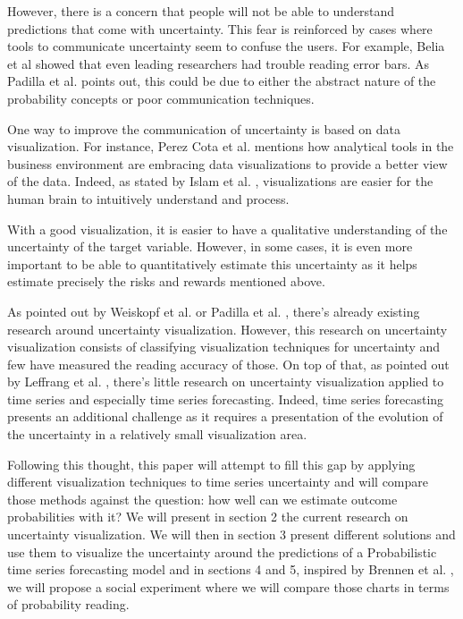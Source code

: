 \documentclass[a4paper,3p,sort&compress]{elsarticle}
\begin{document}
However, there is a concern that people will not be able to understand predictions that come with uncertainty.
This fear is reinforced by cases where tools to communicate uncertainty seem to confuse the users. For example,
Belia et al \cite{belia_researchers_2005} showed that even leading researchers had 
trouble reading error bars. 
As Padilla et al. \cite{padilla_uncertainty_2021} 
points out, this could be due to either the abstract nature of the probability concepts or poor communication techniques.

One way to improve the communication of uncertainty is based on data visualization. For instance, Perez Cota et al. 
\cite{cota_importance_2014} mentions how analytical tools in the business 
environment are embracing data visualizations to provide a better view of the data. Indeed, as 
stated by Islam et al. \cite{islam_overview_2019}, visualizations are easier for the human brain to intuitively understand and process.

With a good visualization, it is easier to have a qualitative understanding of the uncertainty of the target variable. 
However, in some cases, it is even more important to be able to quantitatively estimate this uncertainty as it helps estimate precisely 
the risks and rewards mentioned above. 

As pointed out by Weiskopf et al. \cite{weiskopf_uncertainty_2022} or Padilla et al. \cite{padilla_uncertainty_2021}, 
there's already existing research around uncertainty visualization. However, this research on uncertainty visualization consists of 
classifying visualization techniques for uncertainty and few have measured the reading accuracy of those.
On top of that, as pointed out by Leffrang et al. \cite{leffrang_should_2021}, 
there's little research on uncertainty visualization applied to time series 
and especially time series forecasting. Indeed, time series forecasting presents an additional challenge as it requires a presentation of 
the evolution of the uncertainty in a relatively small visualization area.

Following this thought, this paper will attempt to fill this gap by applying different visualization techniques 
to time series uncertainty and will compare those methods against the question: how well can we estimate outcome probabilities with it? 
We will present in section 2 the current research on uncertainty 
visualization. We will then in section 3
present different solutions and use them to visualize the uncertainty around the predictions 
of a Probabilistic time series forecasting model and in sections 4 and 5,
inspired by Brennen et al. \cite{brennen_instrument_2018}, we will propose a 
social experiment where we will compare those charts in terms of probability reading. 
\end{document}
